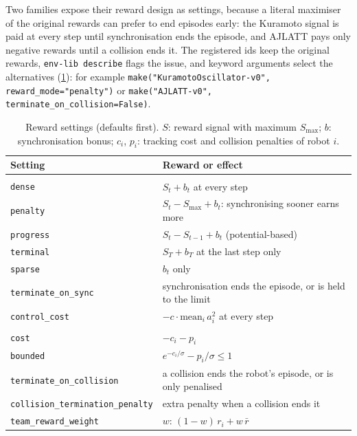 \documentclass{article}
\newcommand{\code}[1]{\texttt{#1}}
\begin{document}
Two families expose their reward design as settings, because a literal
maximiser of the original rewards can prefer to end episodes early: the
Kuramoto signal is paid at every step until synchronisation ends the episode,
and AJLATT pays only negative rewards until a collision ends it. The
registered ids keep the original rewards, \code{env-lib describe} flags the
issue, and keyword arguments select the alternatives
(\cref{tab:rewards}): for example
\code{make("KuramotoOscillator-v0", reward\_mode="penalty")} or
\code{make("AJLATT-v0", terminate\_on\_collision=False)}.

\begin{table}[t]
  \caption{Reward settings (defaults first). $S$: reward signal with maximum
    $S_{\max}$; $b$: synchronisation bonus; $c_i$, $p_i$: tracking cost and
    collision penalties of robot $i$.}
  \label{tab:rewards}
  \centering\footnotesize
  \setlength{\tabcolsep}{3pt}
  \begin{tabular}{@{}>{\raggedright}p{2.55cm}>{\raggedright\arraybackslash}p{5.25cm}@{}}
    \toprule
    Setting & Reward or effect \\
    \midrule
    \multicolumn{2}{@{}l}{\emph{Kuramoto} \code{reward\_mode}} \\
    \code{dense} & $S_t + b_t$ at every step \\
    \code{penalty} & $S_t - S_{\max} + b_t$: synchronising sooner earns more \\
    \code{progress} & $S_t - S_{t-1} + b_t$ (potential-based) \\
    \code{terminal} & $S_T + b_T$ at the last step only \\
    \code{sparse} & $b_t$ only \\
    \code{terminate\_on\_}\allowbreak\code{sync} & synchronisation ends the episode, or is held to the limit \\
    \code{control\_cost} & $-c \cdot \mathrm{mean}_i\, a_i^2$ at every step \\
    \midrule
    \multicolumn{2}{@{}l}{\emph{AJLATT} \code{reward\_mode}} \\
    \code{cost} & $-c_i - p_i$ \\
    \code{bounded} & $e^{-c_i/\sigma} - p_i/\sigma \le 1$ \\
    \midrule
    \code{terminate\_on\_}\allowbreak\code{collision} & a collision ends the robot's episode, or is only penalised \\
    \code{collision\_}\allowbreak\code{termination\_}\allowbreak\code{penalty} & extra penalty when a collision ends it \\
    \code{team\_reward\_}\allowbreak\code{weight} & $w$: $(1-w)\,r_i + w\,\bar r$ \\
    \bottomrule
  \end{tabular}
\end{table}
\end{document}
